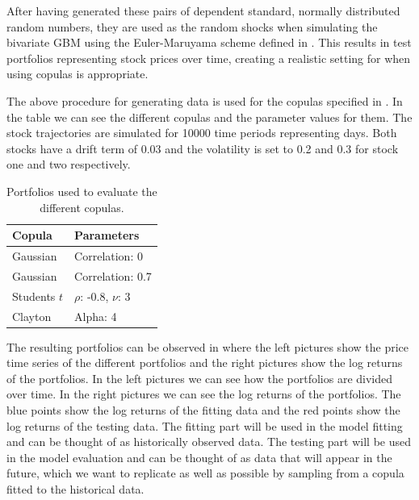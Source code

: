 After having generated these pairs of dependent standard, normally distributed random numbers, they are used as the random shocks when simulating the bivariate \gls{GBM} using the Euler-Maruyama scheme defined in . This results in test portfolios representing stock prices over time, creating a realistic setting for when using copulas is appropriate. 

The above procedure for generating data is used for the copulas specified in . In the table we can see the different copulas and the parameter values for them. The stock trajectories are simulated for 10000 time periods representing days. Both stocks have a drift term of 0.03 and the volatility is set to 0.2 and 0.3 for stock one and two respectively. 
\begin{table}[h!]
    \centering
    \caption{Portfolios used to evaluate the different copulas.}
    \begin{tabular}{ll}
    \textbf{Copula} & \textbf{Parameters} \\
    \hline
    Gaussian & Correlation: 0 \\
    Gaussian & Correlation: 0.7\\
    Students $t$ & $\rho$: -0.8, $\nu$: 3\\
    Clayton & Alpha: 4 \\
    \end{tabular}
    \label{tab:DatasetsUsed}
\end{table}

The resulting portfolios can be observed in  where the left pictures show the price time series of the different portfolios and the right pictures show the log returns of the portfolios. In the left pictures we can see how the portfolios are divided over time. In the right pictures we can see the log returns of the portfolios. The blue points show the log returns of the fitting data and the red points show the log returns of the testing data. The fitting part will be used in the model fitting and can be thought of as historically observed data. The testing part will be used in the model evaluation and can be thought of as data that will appear in the future, which we want to replicate as well as possible by sampling from a copula fitted to the historical data. 

